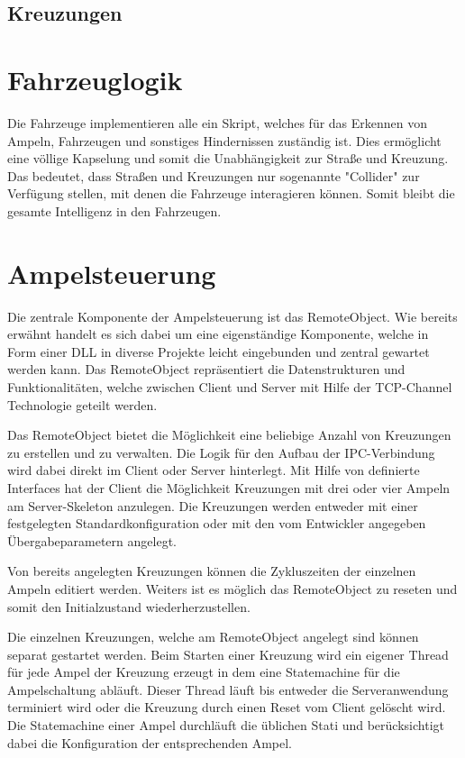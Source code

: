 \subsection{Kreuzungen}

\section{Fahrzeuglogik}
\label{Fahrzeuglogik}

Die Fahrzeuge implementieren alle ein Skript, welches für das Erkennen von Ampeln, Fahrzeugen und sonstiges Hindernissen zuständig ist. Dies ermöglicht eine völlige Kapselung und somit die Unabhängigkeit zur Straße und Kreuzung. Das bedeutet, dass Straßen und Kreuzungen nur sogenannte "Collider" zur Verfügung stellen, mit denen die Fahrzeuge interagieren können. Somit bleibt die gesamte Intelligenz in den Fahrzeugen.



\section{Ampelsteuerung}

Die zentrale Komponente der Ampelsteuerung ist das RemoteObject. Wie bereits erwähnt handelt es sich dabei um eine eigenständige Komponente, welche in Form einer DLL in diverse Projekte leicht eingebunden und zentral gewartet werden kann. Das RemoteObject repräsentiert die Datenstrukturen und Funktionalitäten, welche zwischen Client und Server mit Hilfe der TCP-Channel Technologie geteilt werden.

Das RemoteObject bietet die Möglichkeit eine beliebige Anzahl von Kreuzungen zu erstellen und zu verwalten. Die Logik für den Aufbau der IPC-Verbindung wird dabei direkt im Client oder Server hinterlegt. Mit Hilfe von definierte Interfaces hat der Client die Möglichkeit Kreuzungen mit drei oder vier Ampeln am Server-Skeleton anzulegen. Die Kreuzungen werden entweder mit einer festgelegten Standardkonfiguration oder mit den vom Entwickler angegeben Übergabeparametern angelegt.

Von bereits angelegten Kreuzungen können die Zykluszeiten der einzelnen Ampeln editiert werden. Weiters ist es möglich das RemoteObject zu reseten und somit den Initialzustand wiederherzustellen.

Die einzelnen Kreuzungen, welche am RemoteObject angelegt sind können separat gestartet werden. Beim Starten einer Kreuzung wird ein eigener Thread für jede Ampel der Kreuzung erzeugt in dem eine Statemachine für die Ampelschaltung abläuft. Dieser Thread läuft bis entweder die Serveranwendung terminiert wird oder die Kreuzung durch einen Reset vom Client gelöscht wird. Die Statemachine einer Ampel durchläuft die üblichen Stati und berücksichtigt dabei die Konfiguration der entsprechenden Ampel. 

